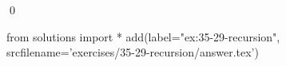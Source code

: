 
\begin{ex}
  \label{ex:35-29-recursion}
  
  \qed
\end{ex}
\begin{python0}
from solutions import *
add(label="ex:35-29-recursion",
    srcfilename='exercises/35-29-recursion/answer.tex')
\end{python0}
